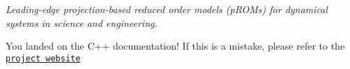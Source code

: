 {\itshape Leading-\/edge projection-\/based reduced order models (p\+R\+O\+Ms) for dynamical systems in science and engineering.}

You landed on the C++ documentation! If this is a mistake, please refer to the \href{https://pressio.github.io/}{\tt project website} 
